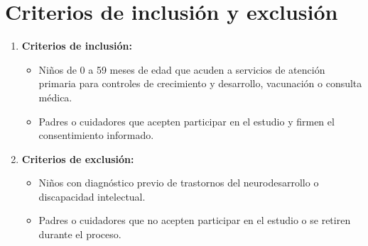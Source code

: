 \documentclass[11pt,letterpaper]{report}
\begin{document}
\section{Criterios de inclusión y exclusión}
\begin{enumerate}
	\item \textbf{Criterios de inclusión:}
		\begin{itemize}
		\item Niños de 0 a 59 meses de edad que acuden a servicios de atención
		primaria para controles de crecimiento y desarrollo, vacunación o
		consulta médica.
		\item Padres o cuidadores que acepten participar en el estudio y firmen
		el consentimiento informado. 
		\end{itemize}
	\item \textbf{Criterios de exclusión:}
		\begin{itemize}
		\item Niños con diagnóstico previo de trastornos del neurodesarrollo o
		discapacidad intelectual. 
		\item Padres o cuidadores que no acepten participar en el estudio o se
		retiren durante el proceso.
		\end{itemize}
\end{enumerate}
\end{document}
